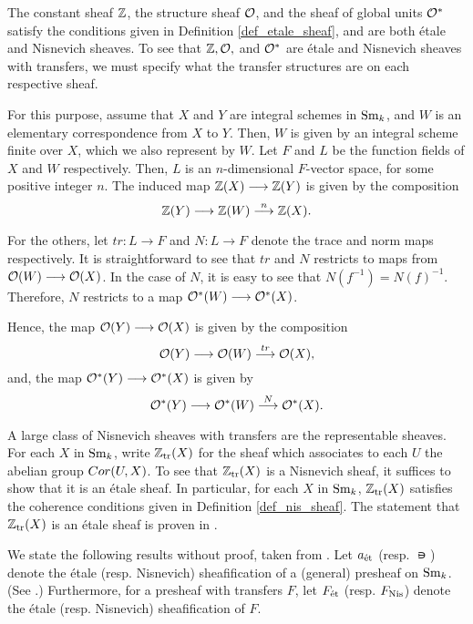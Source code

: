 \begin{ex}\label{ex_Z_O_Ostar}
The constant sheaf $\mathbb{Z}$, the structure sheaf $\mathcal{O}$, and the sheaf
of global units $\mathcal{O}^*$ satisfy the conditions given in Definition
\ref{def_etale_sheaf}, and are both \'etale and Nisnevich sheaves.
To see that $\mathbb{Z}, \mathcal{O},$ and $\mathcal{O}^*$ are \'etale and Nisnevich sheaves
with transfers, we must specify what the transfer structures are
on each respective sheaf.

For this purpose, assume that $X$ and $Y$ are integral schemes
in $\mathrm{Sm}_{k}$, and $W$ is an elementary correspondence from $X$ to $Y$. 
Then, $W$ is given by an integral scheme finite over $X$, which we 
also represent by $W$. Let $F$ and $L$ be the function fields of 
$X$ and $W$ respectively. Then, $L$ is an $n$-dimensional
$F$-vector space, for some positive integer $n$. The induced 
map $\mathbb{Z}(X) \longrightarrow \mathbb{Z}(Y)$ is given by the composition
\[
\mathbb{Z}(Y) \longrightarrow \mathbb{Z}(W) \stackrel{n}{\longrightarrow} \mathbb{Z}(X).
\]

For the others, let $tr: L \to F$ and $N: L \to F$ denote the 
trace and norm maps respectively. It is straightforward to see 
that $tr$ and $N$ restricts to maps from $\mathcal{O}(W) \longrightarrow \mathcal{O}(X)$. In
the case of $N$, it is easy to see that $N(f^{-1}) = N(f)^{-1}$.
Therefore, $N$ restricts to a map $\mathcal{O}^*(W) \longrightarrow \mathcal{O}^*(X)$.

Hence, the map $\mathcal{O}(Y) \longrightarrow \mathcal{O}(X)$ is given by the composition
\[
\mathcal{O}(Y) \longrightarrow \mathcal{O}(W) \stackrel{tr}{\longrightarrow} \mathcal{O}(X),
\]
and, the map $\mathcal{O}^*(Y) \longrightarrow \mathcal{O}^*(X)$ is given by
\[
\mathcal{O}^*(Y) \longrightarrow \mathcal{O}^*(W) \stackrel{N}{\longrightarrow} \mathcal{O}^*(X).
\]
\end{ex}

\begin{ex}\label{ex_ZtrX}
A large class of Nisnevich sheaves with transfers are the 
representable sheaves. For each $X$ in $\mathrm{Sm}_{k}$, write $\mathbb{Z}_{\mathrm{tr}}(X)$
for the sheaf which associates to each $U$ the abelian group
$Cor(U, X)$. To see that $\mathbb{Z}_{\mathrm{tr}}(X)$ is a Nisnevich sheaf, it
suffices to show that it is an \'etale sheaf. In particular,
for each $X$ in $\mathrm{Sm}_{k}$, $\mathbb{Z}_{\mathrm{tr}}(X)$ satisfies the coherence 
conditions given in Definition \ref{def_nis_sheaf}. The statement that
$\mathbb{Z}_{\mathrm{tr}}(X)$ is an \'etale sheaf is proven in \cite[6.2]{MVW}.
\end{ex}

We state the following results without proof, taken from 
\cite{MVW}. Let $a_{\mathrm{\acute{e}t}}$ (resp. $\nis$) denote the \'etale
(resp. Nisnevich) sheafification of a (general) presheaf
on $\mathrm{Sm}_{k}$. (See \cite[3.1.1]{Tamme}.) Furthermore, for a presheaf 
with transfers $F$, let $F_{\mathrm{\acute{e}t}}$ (resp. $F_{\mathrm{Nis}}$) denote the 
\'etale (resp.  Nisnevich) sheafification of $F$. 

